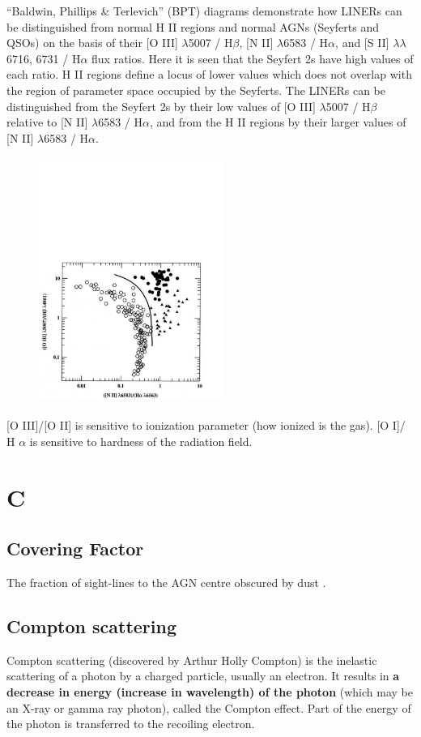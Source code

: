 \documentclass[11pt]{article}
\begin{document}
``Baldwin, Phillips \& Terlevich'' (BPT) diagrams demonstrate how LINERs can be distinguished from normal H II regions and normal AGNs (Seyferts and QSOs) on the basis of their [O III] $\lambda$5007 / H$\beta$, [N II] $\lambda$6583 / H$\alpha$, and [S II] $\lambda \lambda$6716, 6731 / H$\alpha$ flux ratios. Here it is seen that the Seyfert 2s have high values of each ratio. H II regions define a locus of lower values which does not overlap with the region of parameter space occupied by the Seyferts. The LINERs can be distinguished from the Seyfert 2s by their low values of [O III] $\lambda$5007 / H$\beta$ relative to [N II] $\lambda$6583 / H$\alpha$, and from the H II regions by their larger values of [N II] $\lambda$6583 / H$\alpha$. 

\begin{figure}
  \includegraphics[height=8.0cm,width=6.0cm]
  {BPT.pdf}
  \caption[]{}
\end{figure}
[O III]/[O II] is sensitive to ionization parameter (how ionized is the gas).
[O I]/ H $\alpha$ is sensitive to hardness of the radiation field. 



\section*{C}

\subsection*{Covering Factor}
The fraction of sight-lines to the AGN centre obscured by dust
\citep[e.g.,][]{Roseboom2013}.

\subsection*{Compton scattering} 
Compton scattering (discovered by Arthur Holly Compton) is the
inelastic scattering of a photon by a charged particle, usually an
electron. It results in {\bf a decrease in energy (increase in
wavelength) of the photon} (which may be an X-ray or gamma ray
photon), called the Compton effect. Part of the energy of the photon
is transferred to the recoiling electron. 
\end{document}
